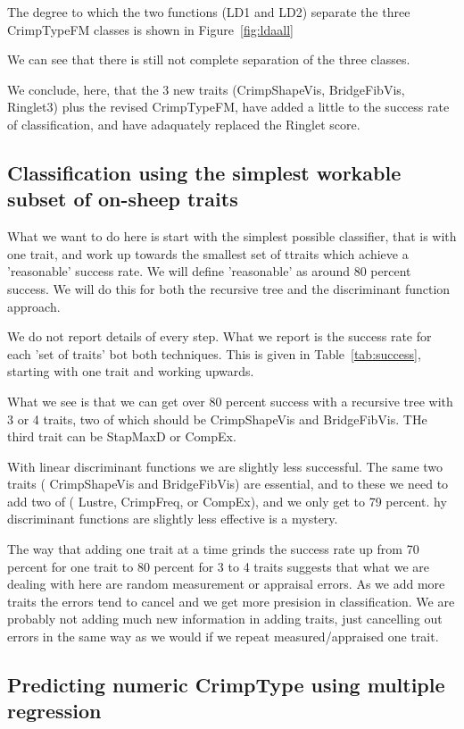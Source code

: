 \documentclass[titlepage]{article}  %
\begin{document}
The degree to which the two functions (LD1 and LD2) separate the three CrimpTypeFM classes is shown in Figure~\ref{fig:ldaall}

We can see that there is still not complete separation of the three classes.

We conclude, here, that the 3 new traits (CrimpShapeVis, BridgeFibVis, Ringlet3) plus the revised CrimpTypeFM, have added a little to the success rate of classification, and have adaquately replaced the Ringlet score.

\subsection{Classification using the simplest workable subset of on-sheep traits}
What we want to do here is start with the simplest possible classifier, that is with one trait, and work up towards the smallest set of ttraits which achieve a 'reasonable' success rate. We will define 'reasonable' as around 80 percent success. We will do this for both the recursive tree and the discriminant function approach.

We do not report details of every step. What we report is the success rate for each 'set of traits' bot both techniques. This is given in Table~\ref{tab:success}, starting with one trait and working upwards. 

What we see is that we can get over 80 percent success with a recursive tree with 3 or 4 traits, two of which should be CrimpShapeVis and BridgeFibVis. THe third trait can be StapMaxD or CompEx.

With linear discriminant functions  we are slightly less successful. The same two traits ( CrimpShapeVis and BridgeFibVis) are essential, and to these we need to add two of ( Lustre, CrimpFreq, or CompEx), and we only get to 79 percent.  hy discriminant functions are slightly less effective is a mystery.

The way that adding one trait at a time grinds the success rate up from 70 percent for one trait to 80 percent for 3 to 4 traits  suggests that what we are dealing with here are random measurement or appraisal errors. As we add more traits the errors tend to cancel and we get more presision in classification. We are probably not adding much new information in adding traits, just cancelling out errors in the same way as we would if we repeat measured/appraised one trait.

\subsection{Predicting numeric CrimpType using multiple regression}
\end{document}
